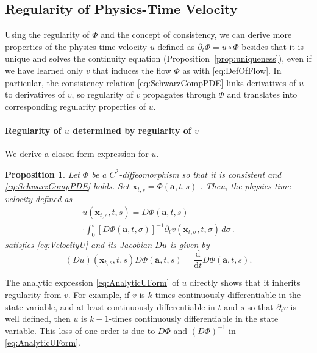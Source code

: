 \documentclass{article}
\newcommand{\bfx}{\boldsymbol{x}}
\newcommand{\bfa}{\boldsymbol{a}}
\theoremstyle{definition}
\theoremstyle{plain}
\newtheorem{proposition}[theorem]{Proposition}
\theoremstyle{definition}
\theoremstyle{remark}
\newcommand{\Flow}{\Phi}
\begin{document}
\subsection{Regularity of Physics-Time Velocity}\label{sec:PropertiesOfU}
Using the regularity of $\Phi$ and the concept of consistency, we can derive more properties of the physics-time velocity $u$ defined as $\partial_t \Phi = u \circ \Phi$ besides that it is unique and solves the continuity equation (Proposition~\ref{prop:uniqueness}), even if we have learned only $v$ that induces the flow $\Phi$ as with \eqref{eq:DefOfFlow}. In particular, the consistency relation \eqref{eq:SchwarzCompPDE} links derivatives of $u$ to derivatives of $v$, so regularity of $v$ propagates through $\Phi$ and translates into corresponding regularity properties of $u$.










\paragraph{Regularity of $u$ determined by regularity of $v$}
We derive a closed-form expression for $u$. 
\begin{proposition}
\label{prop:AnalyticU}
Let $\Phi$ be a $C^2$-diffeomorphism so that it is consistent and \eqref{eq:SchwarzCompPDE} holds. Set $\bfx_{t,s} = \Flow(\bfa, t, s)$ . Then, the physics-time velocity defined as
\begin{multline}
\label{eq:AnalyticUForm}
    u(\bfx_{t,s}, t, s) = D\Flow(\bfa, t, s) \\ \cdot \int_0^s \left[ D\Flow(\bfa, t, \sigma) \right ]^{-1} \partial_t v(\bfx_{t,\sigma}, t, \sigma) \, d\sigma\,.
\end{multline}
satisfies \eqref{eq:VelocityU} and its Jacobian $Du$ is given by 
\begin{equation}
    (Du)(\bfx_{t,s}, t, s) D\Flow(\bfa, t, s)  =  \frac{\mathrm d}{\mathrm d t} D\Flow(\bfa, t, s).
\end{equation}
\end{proposition}

The analytic expression \eqref{eq:AnalyticUForm} of $u$ directly shows that it inherits regularity from $v$. For example, if $v$ is $k$-times continuously differentiable in the state variable, and at least continuously differentiable in $t$ and $s$ so that $\partial_t v$ is well defined, then $u$ is $k-1$-times continuously differentiable in the state variable. This loss of one order is due to $D\Phi$ and $(D\Phi)^{-1}$ in \eqref{eq:AnalyticUForm}. 
\end{document}
